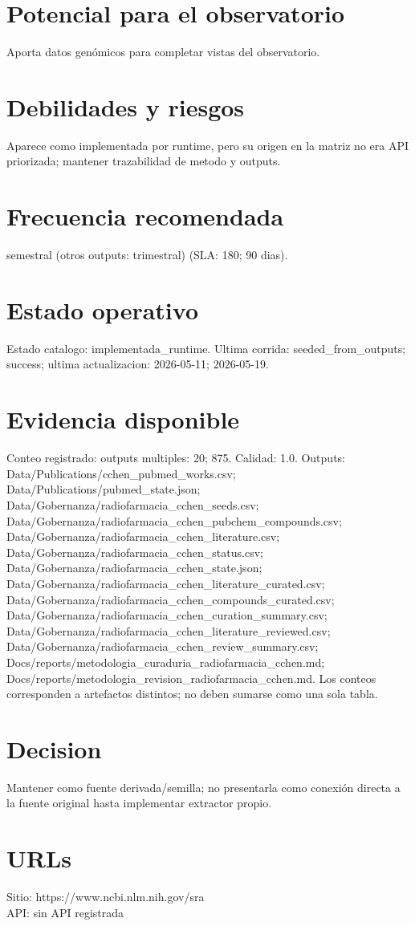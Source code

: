 \documentclass[10pt,a4paper]{article}
\begin{document}
\section*{Potencial para el observatorio}
Aporta datos genómicos para completar vistas del observatorio.

\section*{Debilidades y riesgos}
Aparece como implementada por runtime, pero su origen en la matriz no era API priorizada; mantener trazabilidad de metodo y outputs.

\section*{Frecuencia recomendada}
semestral (otros outputs: trimestral) (SLA: 180; 90 dias).

\section*{Estado operativo}
Estado catalogo: implementada\_runtime. Ultima corrida: seeded\_from\_outputs; success; ultima actualizacion: 2026-05-11; 2026-05-19.

\section*{Evidencia disponible}
Conteo registrado: outputs multiples: 20; 875. Calidad: 1.0. Outputs: Data/Publications/cchen\_pubmed\_works.csv; Data/Publications/pubmed\_state.json; Data/Gobernanza/radiofarmacia\_cchen\_seeds.csv; Data/Gobernanza/radiofarmacia\_cchen\_pubchem\_compounds.csv; Data/Gobernanza/radiofarmacia\_cchen\_literature.csv; Data/Gobernanza/radiofarmacia\_cchen\_status.csv; Data/Gobernanza/radiofarmacia\_cchen\_state.json; Data/Gobernanza/radiofarmacia\_cchen\_literature\_curated.csv; Data/Gobernanza/radiofarmacia\_cchen\_compounds\_curated.csv; Data/Gobernanza/radiofarmacia\_cchen\_curation\_summary.csv; Data/Gobernanza/radiofarmacia\_cchen\_literature\_reviewed.csv; Data/Gobernanza/radiofarmacia\_cchen\_review\_summary.csv; Docs/reports/metodologia\_curaduria\_radiofarmacia\_cchen.md; Docs/reports/metodologia\_revision\_radiofarmacia\_cchen.md. Los conteos corresponden a artefactos distintos; no deben sumarse como una sola tabla.

\section*{Decision}
Mantener como fuente derivada/semilla; no presentarla como conexión directa a la fuente original hasta implementar extractor propio.


\section*{URLs}
Sitio: https://www.ncbi.nlm.nih.gov/sra\\
API: sin API registrada
\end{document}

